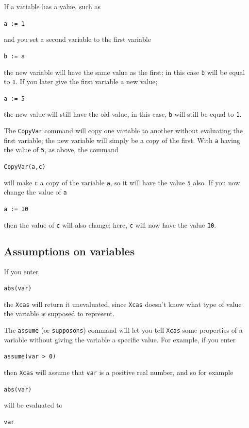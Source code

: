 \documentclass[a4paper,11pt]{book}
\begin{document}
If a variable has a value, such as
\begin{center}
  {\tt a := 1}
\end{center}
and you set a second variable to the first variable
\begin{center}
  {\tt b := a}
\end{center}
the new variable will have the same value as the first; in this case
\texttt{b} will be equal to \texttt{1}.  If you later give the first
variable a new value;
\begin{center}
  {\tt a := 5}
\end{center}
the new value will still have the old value, in this case, \texttt{b}
will still be equal to \texttt{1}.

The \texttt{CopyVar} command will copy one variable to
another without evaluating the first variable; the new variable will
simply be a copy of the first.  With \texttt{a} having the value of
\texttt{5}, as above, the command
\begin{center}
  {\tt CopyVar(a,c)}
\end{center}
will make \texttt{c} a copy of the variable \texttt{a}, so it will
have the value \texttt{5} also.  If you now change the value of
\texttt{a}
\begin{center}
  {\tt a := 10}
\end{center}
then the value of \texttt{c} will also change; here, \texttt{c} will
now have the value \texttt{10}.

\subsection{Assumptions on variables}

If you enter
\begin{center}
  {\tt abs(var)}
\end{center}
the \texttt{Xcas} will return it unevaluated, since \texttt{Xcas}
doesn't know what type of value the variable is supposed to represent.

The \texttt{assume} (or
\texttt{supposons}) command will let you tell
\texttt{Xcas} some properties of a variable without giving the
variable a specific value.  For example, if you enter
\begin{center}
  {\tt assume(var > 0)}
\end{center}
then \texttt{Xcas} will assume that \texttt{var} is a positive real
number, and so for example
\begin{center}
  {\tt abs(var)}
\end{center}
will be evaluated to
\begin{center}
   {\tt var}
\end{center}
\end{document}
